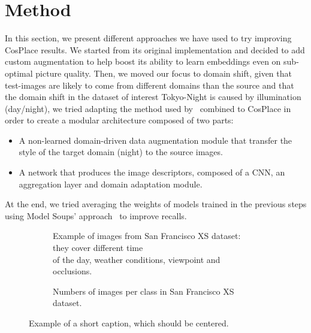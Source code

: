 \documentclass[10pt,twocolumn,letterpaper]{article}
\begin{document}
\section{Method}\label{sec:experiments}
In this section, we present different approaches we have used to try improving CosPlace results. We started from its original implementation and decided to add custom augmentation to help boost its ability to learn embeddings even on sub-optimal picture quality. Then, we moved our focus to domain shift, given that test-images are likely to come from different domains than the source and that the domain shift in the dataset of interest Tokyo-Night is caused by illumination (day/night), we tried adapting the method used by~\cite{adageo} combined to CosPlace in order to create a modular architecture composed of two parts:
\begin{itemize}
    \item A non-learned domain-driven data augmentation module that transfer the style of the target domain (night) to the source images.
    \item A network that produces the image descriptors, composed of a CNN, an aggregation layer and domain adaptation module.
\end{itemize}
At the end, we tried averaging the weights of models trained in the previous steps using Model Soups' approach~\cite{modelsoup} to improve recalls.

\begin{figure*}
  \centering
  \begin{subfigure}{0.58\linewidth}
    \caption{Example of images from San Francisco XS dataset: they cover different time \\of the day, weather conditions, viewpoint and occlusions.}
    \label{fig:short-a}
  \end{subfigure}
  \hfill
  \begin{subfigure}{0.38\linewidth}
    \caption{Numbers of images per class in San Francisco XS dataset.}
    \label{fig:sfxs_density}
  \end{subfigure}
  \caption{Example of a short caption, which should be centered.}
  \label{fig:short}
\end{figure*}
\end{document}
